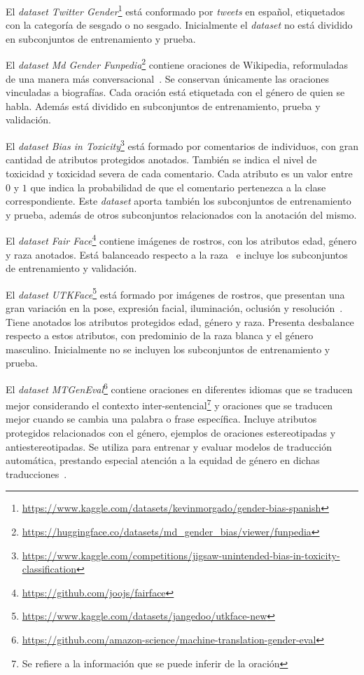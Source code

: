     El \emph{dataset} \emph{Twitter Gender}\footnote{\url{https://www.kaggle.com/datasets/kevinmorgado/gender-bias-spanish}} est\'a conformado por 
    \emph{tweets} en espa\~nol, etiquetados con la categor\'ia de sesgado o no sesgado. Inicialmente el \emph{dataset} no est\'a dividido en subconjuntos de 
    entrenamiento y prueba.

    El \emph{dataset} \emph{Md Gender Funpedia}\footnote{\url{https://huggingface.co/datasets/md_gender_bias/viewer/funpedia}} contiene oraciones de 
    Wikipedia, reformuladas de una manera m\'as conversacional~\parencite{dinan2020multidimensional}. Se conservan \'unicamente las oraciones 
    vinculadas a biograf\'ias. Cada oraci\'on est\'a etiquetada con el g\'enero de quien se habla. Adem\'as est\'a dividido en subconjuntos de 
    entrenamiento, prueba y validaci\'on.

    El \emph{dataset} \emph{Bias in Toxicity}\footnote{\url{https://www.kaggle.com/competitions/jigsaw-unintended-bias-in-toxicity-classification}}
    est\'a formado por comentarios de individuos, con gran cantidad de atributos protegidos anotados. Tambi\'en se 
    indica el nivel de toxicidad y toxicidad severa de cada comentario. Cada atributo es un valor entre $0$ y $1$ que indica la probabilidad de 
    que el comentario pertenezca a la clase correspondiente. Este \emph{dataset} aporta tambi\'en los subconjuntos de entrenamiento y prueba, adem\'as 
    de otros subconjuntos relacionados con la anotaci\'on del mismo.  

    El \emph{dataset} \emph{Fair Face}\footnote{\url{https://github.com/joojs/fairface}} contiene im\'agenes de rostros, con los atributos edad, 
    g\'enero y raza anotados. Est\'a balanceado respecto a la raza~\parencite{karkkainenfairface} e incluye los subconjuntos de entrenamiento y 
    validaci\'on.

    El \emph{dataset} \emph{UTKFace}\footnote{\url{https://www.kaggle.com/datasets/jangedoo/utkface-new}} est\'a formado por im\'agenes de rostros, que 
    presentan una gran variaci\'on en la pose, expresi\'on facial, iluminaci\'on, oclusi\'on y resoluci\'on~\parencite{zhang2017age}. 
    Tiene anotados los atributos protegidos edad, g\'enero y raza. Presenta desbalance respecto a estos atributos, con predominio de la raza 
    blanca y el g\'enero masculino. Inicialmente no se incluyen los subconjuntos de entrenamiento y prueba.

    El \emph{dataset} \emph{MTGenEval}\footnote{\url{https://github.com/amazon-science/machine-translation-gender-eval}} contiene oraciones en 
    diferentes idiomas que se traducen mejor considerando el contexto inter-sentencial\footnote{Se refiere a la informaci\'on que se puede 
    inferir de la oraci\'on} y oraciones que se traducen mejor cuando se cambia una palabra o frase espec\'ifica. Incluye atributos protegidos 
    relacionados con el g\'enero, ejemplos de oraciones estereotipadas y antiestereotipadas. Se utiliza para entrenar y evaluar modelos de 
    traducci\'on autom\'atica, prestando especial atenci\'on a la equidad de g\'enero en dichas traducciones~\parencite{Currey2022}.

